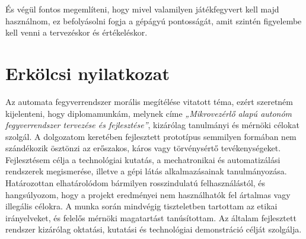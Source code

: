 És végül fontos megemlíteni, hogy mivel valamilyen játékfegyvert kell majd használnom, ez befolyásolni fogja a gépágyú pontosságát, amit szintén figyelembe kell venni a tervezéskor és értékeléskor.\\


\pagebreak

\section{Erkölcsi nyilatkozat}
Az automata fegyverrendszer morális megítélése vitatott téma, ezért szeretném kijelenteni, hogy diplomamunkám, melynek címe \textsl{„Mikrovezérlő alapú autonóm fegyverrendszer tervezése és fejlesztése”}, kizárólag tanulmányi és mérnöki célokat szolgál. A dolgozatom keretében fejlesztett prototípus semmilyen formában nem szándékozik ösztönzi az erőszakos, káros vagy törvénysértő tevékenységeket. Fejlesztésem célja a technológiai kutatás, a mechatronikai és automatizálási rendszerek megismerése, illetve a gépi látás alkalmazásainak tanulmányozása. \\

Határozottan elhatárolódom bármilyen rosszindulatú felhasználástól, és hangsúlyozom, hogy a projekt eredményei nem használhatók fel ártalmas vagy illegális célokra. A munka során mindvégig tiszteletben tartottam az etikai irányelveket, és felelős mérnöki magatartást tanúsítottam. Az általam fejlesztett rendszer kizárólag oktatási, kutatási és technológiai demonstráció célját szolgálja.
